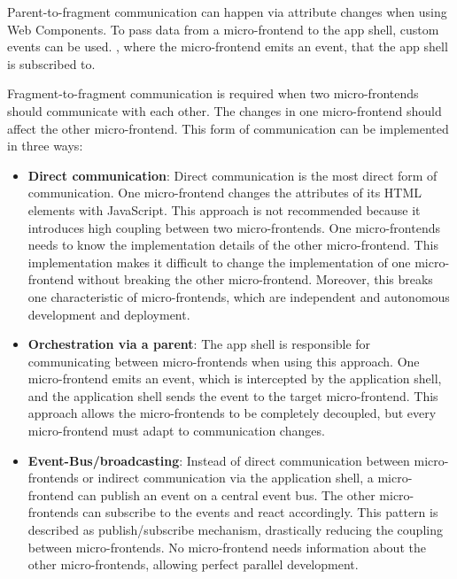 \bigskip

\noindent Parent-to-fragment communication can happen via attribute changes when using Web Components. \cite[58-59]{book:2019:farrell:background:micro-frontends:web-components-in-action} To pass data from a micro-frontend to the app shell, custom events can be used. \cite[315]{book:2019:farrell:background:micro-frontends:web-components-in-action}, where the micro-frontend emits an event, that the app shell is subscribed to. \cite{book:2020:geers:background:micro-frontends:micro-frontends-in-action}

\bigskip

\noindent Fragment-to-fragment communication is required when two micro-frontends should communicate with each other. The changes in one micro-frontend should affect the other micro-frontend. This form of communication can be implemented in three ways: \cite[107-108]{book:2020:geers:background:micro-frontends:micro-frontends-in-action}

\begin{itemize}
    \item \textbf{Direct communication}: Direct communication is the most direct form of communication. One micro-frontend changes the attributes of its HTML elements with JavaScript. This approach is not recommended because it introduces high coupling between two micro-frontends. One micro-frontends needs to know the implementation details of the other micro-frontend. This implementation makes it difficult to change the implementation of one micro-frontend without breaking the other micro-frontend. Moreover, this breaks one characteristic of micro-frontends, which are independent and autonomous development and deployment.
    \item \textbf{Orchestration via a parent}: The app shell is responsible for communicating between micro-frontends when using this approach. One micro-frontend emits an event, which is intercepted by the application shell, and the application shell sends the event to the target micro-frontend. This approach allows the micro-frontends to be completely decoupled, but every micro-frontend must adapt to communication changes.
    \item \textbf{Event-Bus/broadcasting}: Instead of direct communication between micro-frontends or indirect communication via the application shell, a micro-frontend can publish an event on a central event bus. The other micro-frontends can subscribe to the events and react accordingly. This pattern is described as publish/subscribe mechanism, drastically reducing the coupling between micro-frontends. No micro-frontend needs information about the other micro-frontends, allowing perfect parallel development.
\end{itemize}
